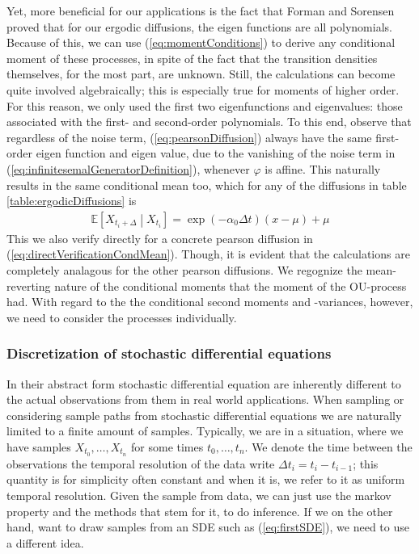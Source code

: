 Yet, more beneficial for our applications is the fact that Forman and Sorensen \cite{FormanSorensen2008} proved that for our ergodic diffusions, the eigen functions are all polynomials. Because of this, we can use (\ref{eq:momentConditions}) to derive any conditional moment of these processes, in spite of the fact that the transition densities themselves, for the most part, are unknown. Still, the calculations can become quite involved algebraically; this is especially true for moments of higher order. For this reason, we only used the first two eigenfunctions and eigenvalues: those associated with the first- and second-order polynomials. To this end, observe that regardless of the noise term, (\ref{eq:pearsonDiffusion}) always have the same first-order eigen function and eigen value, due to the vanishing of the noise term in (\ref{eq:infinitesemalGeneratorDefinition}), whenever $\varphi$ is affine. This naturally results in the same conditional mean too, which for any of the diffusions in table \ref{table:ergodicDiffusions} is
\begin{align}
    \mathbb{E}\left[X_{t_{i}+\Delta} \middle|X_{t_{i}} \right] = \exp\left(-\alpha_0\Delta t\right)\left(x-\mu\right) + \mu
\end{align}
This we also verify directly for a concrete pearson diffusion in (\ref{eq:directVerificationCondMean}). Though, it is evident that the calculations are completely analagous for the other pearson diffusions. We regognize the mean-reverting nature of the conditional moments that the moment of the OU-process had. With regard to the the conditional second moments and -variances, however, we need to consider the processes individually.
\subsubsection{Discretization of stochastic differential equations}\label{subsubsec:Discretization}
In their abstract form stochastic differential equation are inherently different to the actual observations from them in real world applications.
When sampling or considering sample paths from stochastic differential equations we are naturally limited to a finite amount of samples. Typically, we are in a situation, where we have samples $X_{t_0},\dots,X_{t_n}$ for some times $t_0,\dots,t_n$. We denote the time between the observations the temporal resolution of the data write $\Delta t_i = t_{i} - t_{i - 1}$; this quantity is for simplicity often constant and when it is, we refer to it as uniform temporal resolution. Given the sample from data, we can just use the markov property and the methods that stem for it, to do inference. If we on the other hand, want to draw samples from an SDE such as  (\ref{eq:firstSDE}), we need to use a different idea. 
